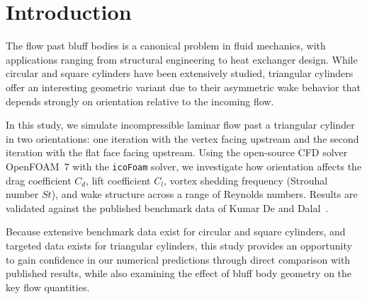 \section{Introduction}

The flow past bluff bodies is a canonical problem in fluid mechanics, with applications ranging from structural engineering to heat exchanger design. While circular and square cylinders have been extensively studied, triangular cylinders offer an interesting geometric variant due to their asymmetric wake behavior that depends strongly on orientation relative to the incoming flow.

In this study, we simulate incompressible laminar flow past a triangular cylinder in two orientations: one iteration with the vertex facing upstream and the second iteration with the flat face facing upstream. Using the open-source CFD solver OpenFOAM~7 with the \texttt{icoFoam} solver, we investigate how orientation affects the drag coefficient $C_d$, lift coefficient $C_l$, vortex shedding frequency (Strouhal number $St$), and wake structure across a range of Reynolds numbers. Results are validated against the published benchmark data of Kumar De and Dalal~\cite{kumardalal2006}.

Because extensive benchmark data exist for circular and square cylinders, and targeted data exists for triangular cylinders, this study provides an opportunity to gain confidence in our numerical predictions through direct comparison with published results, while also examining the effect of bluff body geometry on the key flow quantities.
